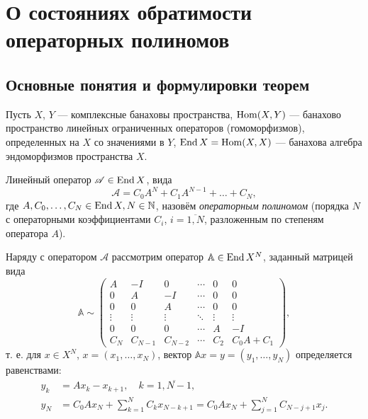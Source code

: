 \intro

\chapter{О состояниях обратимости операторных полиномов}
\section{Основные понятия и формулировки теорем}
Пусть $X$, $Y$ --- комплексные банаховы пространства, $\operatorname{Hom}(X, Y)$ --- банахово пространство линейных ограниченных операторов (гомоморфизмов), определенных на $X$ со значениями в $Y$, $\operatorname{End} X = \operatorname{Hom}(X, X)$ --- банахова алгебра эндоморфизмов пространства $X$.

Линейный оператор $ \mathcal A \in \operatorname{End} X$, вида
\[  \mathcal A = C_0 A^N + C_1 A^{N - 1} + \dotsc + C_N, \]
где $A, C_0, \dotsc, C_N \in \operatorname{End} X, N \in \mathbb{N}$, назовём \emph{операторным полиномом} (порядка $N$ с операторными коэффициентами $C_i$, $i = \overline{1,N}$, разложенным по степеням оператора $A$).

Наряду с оператором $\mathcal A$ рассмотрим оператор $\mathbb A \in \operatorname{End} X^{N}$, заданный матрицей вида
\[ \mathbb A \sim \begin{pmatrix}
    A & -I & 0  & \cdots & 0 & 0 \\
    0 & A  & -I & \cdots & 0 & 0 \\
    0 & 0  & A & \cdots & 0 & 0 \\
    \vdots & \vdots & \vdots & \ddots & \vdots & \vdots \\
    0 & 0 & 0 & \cdots & A & -I \\
    C_N & C_{N-1} & C_{N-2} & \cdots & C_2 & C_0 A + C_1
   \end{pmatrix}, \]
т. е. для $x \in X^{N}$, $x = (x_1, \dotsc, x_{N})$, вектор $\mathbb A x = y = (y_1, \dotsc, y_{N})$ определяется равенствами:
\begin{align*}
    y_k &= Ax_k - x_{k + 1}, \quad k = \overline{1,N-1}, \\
    y_{N} &= C_0 A x_N + \sum_{k = 1}^{N} C_k x_{N - k + 1} = C_0 A x_N + \sum_{j = 1}^{N} C_{N - j + 1} x_{j}.
\end{align*}

